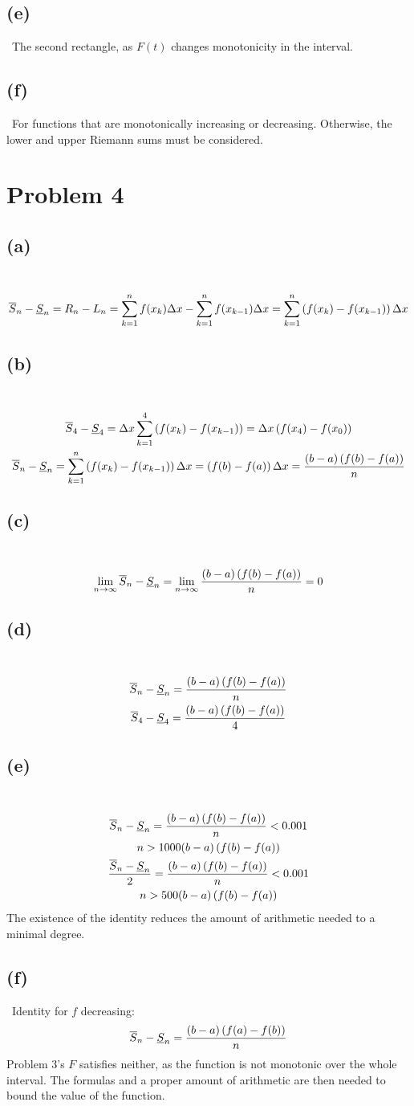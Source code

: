\documentclass[12pt]{article}
\newcommand*{\paren}[1]{\ensuremath\left(#1\right)}
\newcommand{\vem}{\vspace{0.5em}}
\newcommand{\problem}[1]{\section{Problem #1}}
\newcommand{\subproblem}[1]{\subsection{(#1)} \,}
\begin{document}
\subproblem{e}
The second rectangle, as $F(t)$ changes monotonicity in the interval. \vem

\subproblem{f}
For functions that are monotonically increasing or decreasing. Otherwise, the lower and upper Riemann sums must be considered. 

\problem{4}

\subproblem{a}
\[
\overline{S}_n-\underline{S}_n=R_n-L_n=\sum_{k=1}^n f(x_{k})\Delta x-\sum_{k=1}^n f(x_{k-1})\Delta x=\sum_{k=1}^n \paren{f(x_k)-f(x_{k-1})}\Delta x
\]

\subproblem{b}
\begin{gather*}
    \overline{S}_4-\underline{S}_4=\Delta x\sum_{k=1}^4 \paren{f(x_k)-f(x_{k-1})}=\Delta x\paren{f(x_4)-f(x_0)}\\
    \overline{S}_n-\underline{S}_n=\sum_{k=1}^n \paren{f(x_k)-f(x_{k-1})}\Delta x=\paren{f(b)-f(a)}\Delta x=\frac{(b-a)\paren{f(b)-f(a)}}{n}
\end{gather*}

\subproblem{c}
\begin{gather*}
   \lim_{n \to \infty} \overline{S}_n-\underline{S}_n=\lim_{n \to \infty}\frac{(b-a)\paren{f(b)-f(a)}}{n} =0
\end{gather*}

\subproblem{d}
\begin{gather*}
 \overline{S}_n-\underline{S}_n=\frac{(b-a)\paren{f(b)-f(a)}}{n}\\
    \overline{S}_4-\underline{S}_4=\frac{(b-a)\paren{f(b)-f(a)}}{4}
\end{gather*}

\subproblem{e}
\begin{gather*}
    \overline{S}_n-\underline{S}_n=\frac{(b-a)\paren{f(b)-f(a)}}{n} < 0.001\\
    n>1000(b-a)\paren{f(b)-f(a)}\\
    \frac{\overline{S}_n-\underline{S}_n}{2}=\frac{(b-a)\paren{f(b)-f(a)}}{n} < 0.001\\
    n>500(b-a)\paren{f(b)-f(a)}
\end{gather*}
The existence of the identity reduces the amount of arithmetic needed to a minimal degree.\vem

\subproblem{f}
Identity for $f$ decreasing:
\[
\overline{S}_n-\underline{S}_n=\frac{(b-a)\paren{f(a)-f(b)}}{n}
\]
Problem 3's $F$ satisfies neither, as the function is not monotonic over the whole interval. The formulas and a proper amount of arithmetic are then needed to bound the value of the function.
\end{document}
